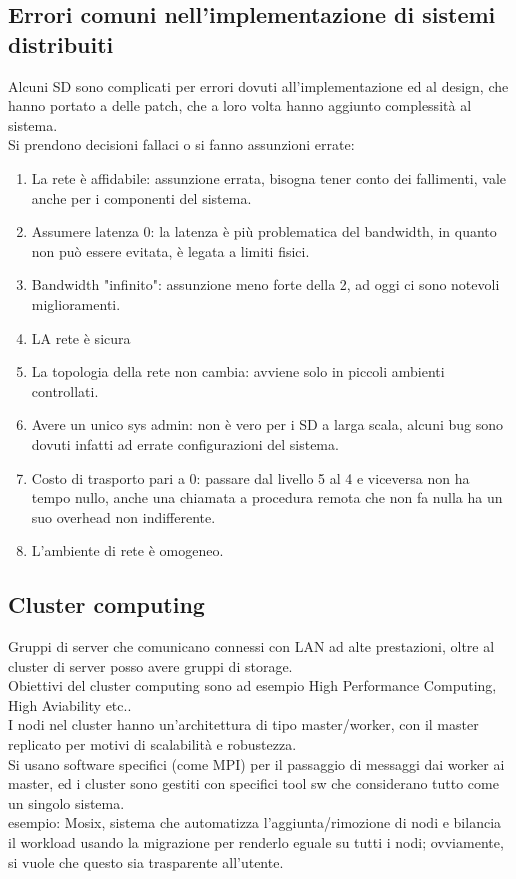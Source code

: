 \documentclass[16px]{article}
\begin{document}
\subsection{Errori comuni nell'implementazione di sistemi distribuiti}
Alcuni SD sono complicati per errori dovuti all'implementazione ed al design, che hanno portato a delle patch, che a loro volta hanno aggiunto complessità al sistema.\\ Si prendono decisioni fallaci o si fanno assunzioni errate:
\begin{enumerate}
\item La rete è affidabile: assunzione errata, bisogna tener conto dei fallimenti, vale anche per i componenti del sistema.
\item Assumere latenza 0: la latenza è più problematica del bandwidth, in quanto non può essere evitata, è legata a limiti fisici.
\item Bandwidth "infinito": assunzione meno forte della 2, ad oggi ci sono notevoli miglioramenti.
\item LA rete è sicura
\item La topologia della rete non cambia: avviene solo in piccoli ambienti controllati.
\item Avere un unico sys admin: non è vero per i SD a larga scala, alcuni bug sono dovuti infatti ad errate configurazioni del sistema.
\item Costo di trasporto pari a 0: passare dal livello 5 al 4 e viceversa non ha tempo nullo, anche una chiamata a procedura remota che non fa nulla ha un suo overhead non indifferente.
\item L'ambiente di rete è omogeneo.
\end{enumerate}
\subsection{Cluster computing}
Gruppi di server che comunicano connessi con LAN ad alte prestazioni, oltre al cluster di server posso avere gruppi di storage.\\ Obiettivi del cluster computing sono ad esempio High Performance Computing, High Aviability etc..\\ I nodi nel cluster hanno un'architettura di tipo master/worker, con il master replicato per motivi di scalabilità e robustezza.\\ Si usano software specifici (come MPI) per il passaggio di messaggi dai worker ai master, ed i cluster sono gestiti con specifici tool sw che considerano tutto come un singolo sistema.\\ esempio: Mosix, sistema che automatizza l'aggiunta/rimozione di nodi e bilancia il workload usando la migrazione per renderlo eguale su tutti i nodi; ovviamente, si vuole che questo sia trasparente all'utente.
\end{document}
